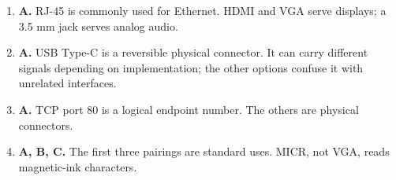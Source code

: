 \begin{enumerate}[label=\textbf{Q\arabic*.}, leftmargin=*]
\item \textbf{A.} RJ-45 is commonly used for Ethernet. HDMI and VGA serve displays; a 3.5 mm jack serves analog audio.

\item \textbf{A.} USB Type-C is a reversible physical connector. It can carry different signals depending on implementation; the other options confuse it with unrelated interfaces.

\item \textbf{A.} TCP port 80 is a logical endpoint number. The others are physical connectors.

\item \textbf{A, B, C.} The first three pairings are standard uses. MICR, not VGA, reads magnetic-ink characters.

\end{enumerate}
